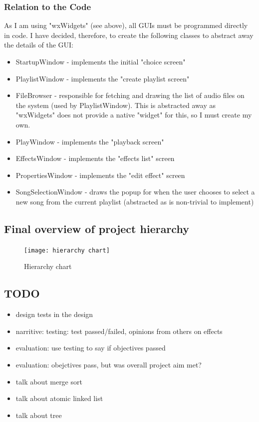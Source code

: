 \subsubsection{Relation to the Code}
As I am using "wxWidgets" (see above), all GUIs must be programmed directly in code. I have decided, therefore, to create the following classes to abstract away the details of the GUI:
\begin{itemize}
	\item StartupWindow - implements the initial "choice screen"
	\item PlaylistWindow - implements the "create playlist screen"
	\item FileBrowser - responsible for fetching and drawing the  list of audio files on the system (used by PlaylistWindow). This is abstracted away as "wxWidgets" does not provide a native "widget" for this, so I must create my own.
	\item PlayWindow - implements the "playback screen"
	\item EffectsWindow - implements the "effects list" screen
	\item PropertiesWindow - implements the "edit effect" screen
	\item SongSelectionWindow - draws the popup for when the user chooses to select a new song from the current playlist (abstracted as is non-trivial to implement)
\end{itemize}

\pagebreak
\subsection{Final overview of project hierarchy}
\begin{figure}[H]
	\texttt{[image: hierarchy chart]}
	\caption{Hierarchy chart }
\end{figure}

\pagebreak
\subsection{TODO}
\begin{itemize}
	\item design tests in the design
	\item narritive: testing: test passed/failed, opinions from others on effects
	\item evaluation: use testing to say if objectives passed
	\item evaluation: obejctives pass, but was overall project aim met?
	\item talk about merge sort
	\item talk about atomic linked list
	\item talk about tree
\end{itemize}